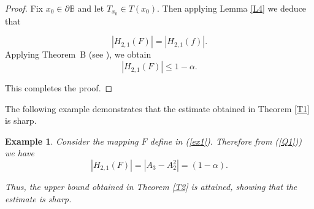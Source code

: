 \documentclass[11pt, reqno]{amsart}
\newtheorem{exm}{Example}[section]
\numberwithin{equation}{section}
\begin{document}
\begin{proof}
 Fix $x_0\in \partial{\mathbb{B}}$ and let $T_{x_0}\in T(x_0)$. Then applying Lemma \ref{L4} we deduce that

\[
|H_{2,1}(F)|
=
|H_{2,1}(f)|.
\]
Applying Theorem~B (see \cite[Theorem 2.3]{CKKLS2018}),
we obtain
\[
|H_{2,1}(F)| \leq 1-\alpha.\]

This completes the proof.
\end{proof}

The following example demonstrates that the estimate obtained in Theorem \ref{T1} is sharp.

\begin{exm}
Consider the mapping $F$ define in (\ref{ex1}). 
Therefore from (\ref{Q1})) we have 
\[
|H_{2,1}(F)|
=
\left|A_3-A_2^2\right|
=(1-\alpha).
\]

Thus, the upper bound obtained in Theorem \ref{T2} is attained, showing that the estimate is sharp.
\end{exm}
\end{document}
